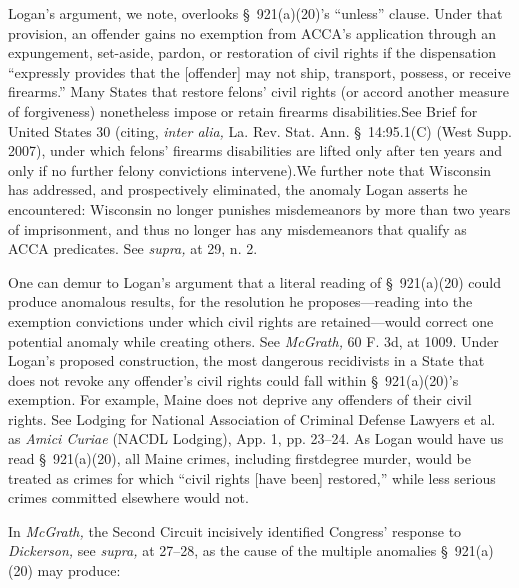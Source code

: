   Logan's argument, we note, overlooks \S~921(a)(20)'s ``unless'' clause. Under that provision, an offender gains no exemption from ACCA's application through an expungement, set-aside, pardon, or restoration of civil rights if the dispensation ``expressly provides that the [offender] may not ship, transport, possess, or receive firearms.'' Many States that restore felons' civil rights (or accord another measure of forgiveness) nonetheless impose or retain firearms disabilities.\newpage  See Brief for United States 30 (citing, \emph{inter alia,} La. Rev. Stat. Ann. \S~14:95.1(C) (West Supp. 2007), under which felons' firearms disabilities are lifted only after ten years and only if no further felony convictions intervene).\footnotemark[4] We further note that Wisconsin has addressed, and prospectively eliminated, the anomaly Logan asserts he encountered: Wisconsin no longer punishes misdemeanors by more than two years of imprisonment, and thus no longer has any misdemeanors that qualify as ACCA predicates. See \emph{supra,} at 29, n. 2.

  One can demur to Logan's argument that a literal reading of \S~921(a)(20) could produce anomalous results, for the resolution he proposes---reading into the exemption convictions under which civil rights are retained---would correct one potential anomaly while creating others. See \emph{McGrath,} 60 F. 3d, at 1009. Under Logan's proposed construction, the most dangerous recidivists in a State that does not revoke any offender's civil rights could fall within \S~921(a)(20)'s exemption. For example, Maine does not deprive any offenders of their civil rights. See Lodging for National Association of Criminal Defense Lawyers et al. as \emph{Amici Curiae} (NACDL Lodging), App. 1, pp. 23--24. As Logan would have us read \S~921(a)(20), all Maine crimes, including firstdegree murder, would be treated as crimes for which ``civil rights [have been] restored,'' while less serious crimes committed elsewhere would not.

  In \emph{McGrath,} the Second Circuit incisively identified Congress' response to \emph{Dickerson,} see \emph{supra,} at 27--28, as the cause of the multiple anomalies \S~921(a)(20) may produce:


